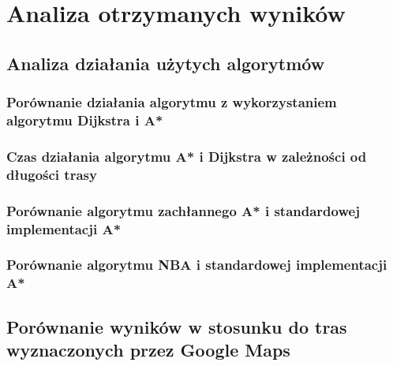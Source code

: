 \chapter{Analiza otrzymanych wyników}
\label{cha:analiza_otrzymanych_wynikow}


\section{Analiza działania użytych algorytmów}



\subsection{Porównanie działania algorytmu z wykorzystaniem algorytmu Dijkstra i A*}



\subsection{Czas działania algorytmu A* i Dijkstra w zależności od długości trasy}



\subsection{Porównanie algorytmu zachłannego A* i standardowej implementacji A*}



\subsection{Porównanie algorytmu NBA i standardowej implementacji A*}



\section{Porównanie wyników w stosunku do tras wyznaczonych przez Google Maps}